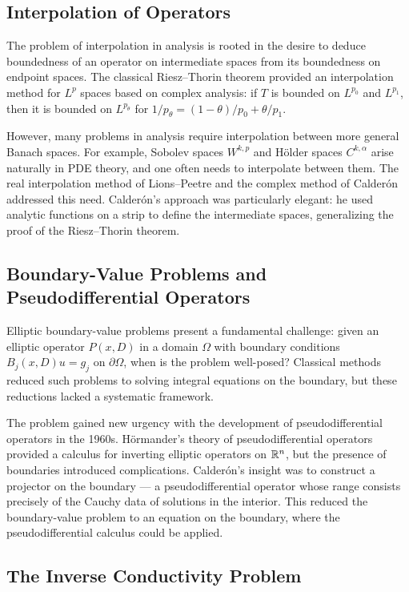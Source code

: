 \subsection{Interpolation of Operators}

The problem of interpolation in analysis is rooted in the desire to deduce boundedness of an operator on intermediate spaces from its boundedness on endpoint spaces. The classical Riesz--Thorin theorem provided an interpolation method for $L^p$ spaces based on complex analysis: if $T$ is bounded on $L^{p_0}$ and $L^{p_1}$, then it is bounded on $L^{p_\theta}$ for $1/p_\theta = (1-\theta)/p_0 + \theta/p_1$.

However, many problems in analysis require interpolation between more general Banach spaces. For example, Sobolev spaces $W^{k,p}$ and H\"older spaces $C^{k,\alpha}$ arise naturally in PDE theory, and one often needs to interpolate between them. The real interpolation method of Lions--Peetre and the complex method of Calder\'{o}n addressed this need. Calder\'{o}n's approach was particularly elegant: he used analytic functions on a strip to define the intermediate spaces, generalizing the proof of the Riesz--Thorin theorem.

\subsection{Boundary-Value Problems and Pseudodifferential Operators}

Elliptic boundary-value problems present a fundamental challenge: given an elliptic operator $P(x,D)$ in a domain $\Omega$ with boundary conditions $B_j(x,D)u = g_j$ on $\partial\Omega$, when is the problem well-posed? Classical methods reduced such problems to solving integral equations on the boundary, but these reductions lacked a systematic framework.

The problem gained new urgency with the development of pseudodifferential operators in the 1960s. H\"ormander's theory of pseudodifferential operators provided a calculus for inverting elliptic operators on $\mathbb{R}^n$, but the presence of boundaries introduced complications. Calder\'{o}n's insight was to construct a projector on the boundary --- a pseudodifferential operator whose range consists precisely of the Cauchy data of solutions in the interior. This reduced the boundary-value problem to an equation on the boundary, where the pseudodifferential calculus could be applied.

\subsection{The Inverse Conductivity Problem}

